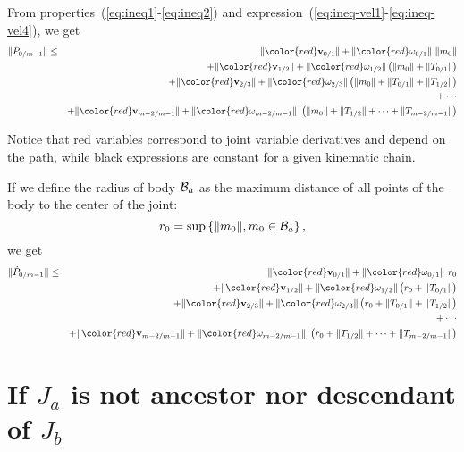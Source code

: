 \documentclass {article}
\newcommand\body{{\cal B}}
\newcommand\linvel{\textbf{v}}
\begin{document}
From properties~(\ref{eq:ineq1}-\ref{eq:ineq2}) and expression~(\ref{eq:ineq-vel1}-\ref{eq:ineq-vel4}), we get
\begin {eqnarray*}
\|\dot{P}_{0/m-1}\| &\leq&
\|{\color{red}\linvel_{0/1}}\| + \|{\color{red}\omega_{0/1}}\|\ \|m_0\|\\
&& + \|{\color{red}\linvel_{1/2}}\| + \|{\color{red}\omega_{1/2}}\| \left(\|m_0\| + \|T_{0/1}\|\right) \\
&& + \|{\color{red}\linvel_{2/3}}\| + \|{\color{red}\omega_{2/3}}\| \left(\|m_0\| + \|T_{0/1}\| + \|T_{1/2}\|\right) \\
&& + \cdots \\
&& + \|{\color{red}\linvel_{m-2/m-1}}\| + \|{\color{red}\omega_{m-2/m-1}}\|\ \left(\|m_0\| + \|T_{1/2}\| + \cdots + \|T_{m-2/m-1}\|\right)
\end {eqnarray*}

Notice that red variables correspond to joint variable derivatives and depend on the path, while black expressions are constant for a given kinematic chain.

If we define the radius of body $\body_a$ as the maximum distance of all points of the body to the center of the joint:
$$
r_0 = \sup \left\{\|m_0\|, m_0\in\body_a\right\},
$$
we get
\begin {eqnarray*}
\|\dot{P}_{0/m-1}\| &\leq&
\|{\color{red}\linvel_{0/1}}\| + \|{\color{red}\omega_{0/1}}\|\ r_0\\
&& + \|{\color{red}\linvel_{1/2}}\| + \|{\color{red}\omega_{1/2}}\| \left(r_0 + \|T_{0/1}\|\right) \\
&& + \|{\color{red}\linvel_{2/3}}\| + \|{\color{red}\omega_{2/3}}\| \left(r_0 + \|T_{0/1}\| + \|T_{1/2}\|\right) \\
&& + \cdots \\
&& + \|{\color{red}\linvel_{m-2/m-1}}\| + \|{\color{red}\omega_{m-2/m-1}}\|\ \left(r_0 + \|T_{1/2}\| + \cdots + \|T_{m-2/m-1}\|\right)
\end {eqnarray*}

\section {If $J_a$ is not ancestor nor descendant of $J_{b}$}
\end{document}
